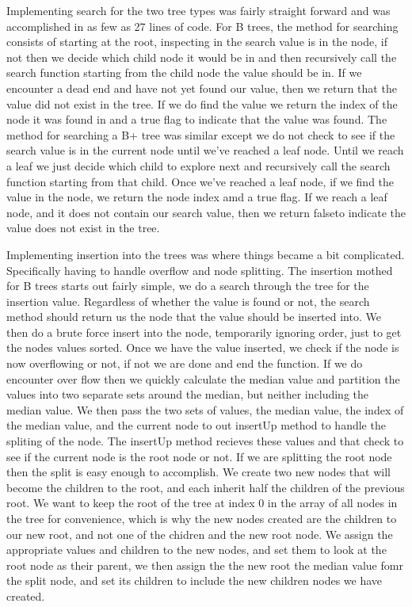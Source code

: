     Implementing search for the two tree types was fairly straight forward and was accomplished in as few as 27 lines of code.  
For B trees, the method for searching consists of starting at the root, inspecting in the search value is in the node, if not 
then we decide which child node it would be in and then recursively call the search function starting from the child node the value 
should be in.  If we encounter a dead end and have not yet found our value, then we return that the value did not exist in the tree.
If we do find the value we return the index of the node it was found in and a true flag to indicate that the value was found.  The 
method for searching a B+ tree was similar except we do not check to see if the search value is in the current node until we've 
reached a leaf node.  Until we reach a leaf we just decide which child to explore next and recursively call the search function 
starting from that child.  Once we've reached a leaf node, if we find the value in the node, we return the node index amd a true flag.  If we reach a leaf node, and it does not contain our search value, then we return falseto indicate the value does not exist
 in the tree.
 
    Implementing insertion into the trees was where things became a bit complicated.  Specifically having to handle overflow and node splitting.  The insertion mothed for B trees starts out fairly simple, we do a search through the tree for the insertion value.  Regardless of whether the value is found or not, the search method should return us the node that the value should be inserted into.  We then do a brute force insert into the node, temporarily ignoring order, just to get the nodes values sorted.  Once we have the value inserted, we check if the node is now overflowing or not, if not we are done and end the function.  If we do encounter over flow then we quickly calculate the median value and partition the values into two separate sets around the median, but neither including the median value.  We then pass the two sets of values, the median value, the index of the median value, and the current node to out insertUp method to handle the spliting of the node.  The insertUp method recieves these values and that check to see if the current node is the root node or not.  If we are splitting the root node then the split is easy enough to accomplish.  We create two new nodes that will become the children to the root, and each inherit half the children of the previous root.  We want to keep the root of the tree at index 0 in the array of all nodes in the tree for convenience, which is why the new nodes created are the children to our new root, and not one of the chidren and the new root node.  We assign the appropriate values and children to the new nodes, and set them to look at the root node as their parent, we then assign the the new root the median value fomr the split node, and set its children to include the new children nodes we have created.
    
